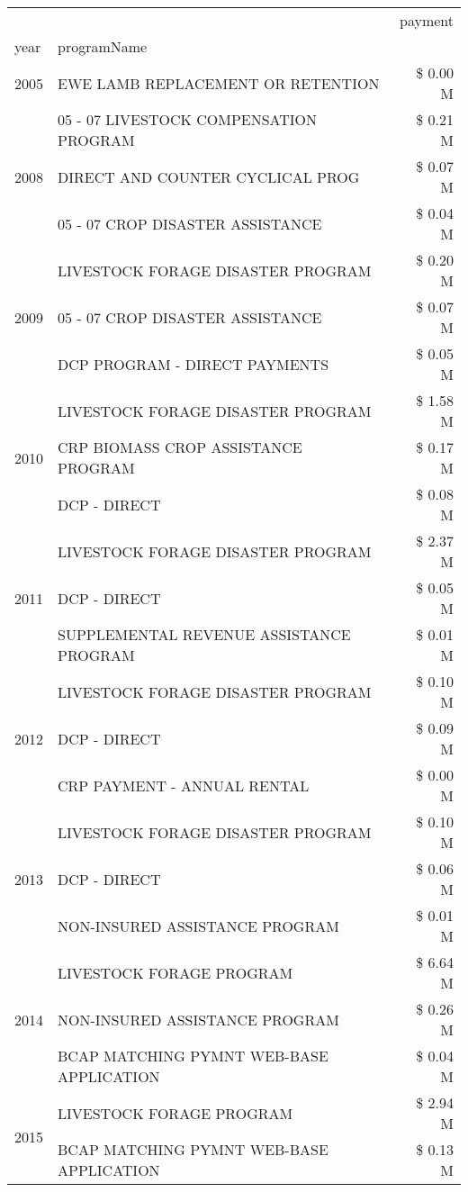 \begin{tabular}{llr}
\toprule
 &  & payment \\
year & programName &  \\
\midrule
2005 & EWE LAMB REPLACEMENT OR RETENTION & \$ 0.00 M \\
\cline{1-3}
\multirow[t]{3}{*}{2008} & 05 - 07 LIVESTOCK COMPENSATION PROGRAM & \$ 0.21 M \\
 & DIRECT AND COUNTER CYCLICAL PROG & \$ 0.07 M \\
 & 05 - 07 CROP DISASTER ASSISTANCE & \$ 0.04 M \\
\cline{1-3}
\multirow[t]{3}{*}{2009} & LIVESTOCK FORAGE DISASTER  PROGRAM & \$ 0.20 M \\
 & 05 - 07 CROP DISASTER ASSISTANCE & \$ 0.07 M \\
 & DCP PROGRAM - DIRECT PAYMENTS & \$ 0.05 M \\
\cline{1-3}
\multirow[t]{3}{*}{2010} & LIVESTOCK FORAGE DISASTER PROGRAM & \$ 1.58 M \\
 & CRP BIOMASS CROP ASSISTANCE PROGRAM & \$ 0.17 M \\
 & DCP - DIRECT & \$ 0.08 M \\
\cline{1-3}
\multirow[t]{3}{*}{2011} & LIVESTOCK FORAGE DISASTER PROGRAM & \$ 2.37 M \\
 & DCP - DIRECT & \$ 0.05 M \\
 & SUPPLEMENTAL REVENUE ASSISTANCE PROGRAM & \$ 0.01 M \\
\cline{1-3}
\multirow[t]{3}{*}{2012} & LIVESTOCK FORAGE DISASTER PROGRAM & \$ 0.10 M \\
 & DCP - DIRECT & \$ 0.09 M \\
 & CRP PAYMENT - ANNUAL RENTAL & \$ 0.00 M \\
\cline{1-3}
\multirow[t]{3}{*}{2013} & LIVESTOCK FORAGE DISASTER PROGRAM & \$ 0.10 M \\
 & DCP - DIRECT & \$ 0.06 M \\
 & NON-INSURED ASSISTANCE PROGRAM & \$ 0.01 M \\
\cline{1-3}
\multirow[t]{3}{*}{2014} & LIVESTOCK FORAGE PROGRAM & \$ 6.64 M \\
 & NON-INSURED ASSISTANCE PROGRAM & \$ 0.26 M \\
 & BCAP MATCHING PYMNT WEB-BASE APPLICATION & \$ 0.04 M \\
\cline{1-3}
\multirow[t]{3}{*}{2015} & LIVESTOCK FORAGE PROGRAM & \$ 2.94 M \\
 & BCAP MATCHING PYMNT WEB-BASE APPLICATION & \$ 0.13 M \\

\end{tabular}
